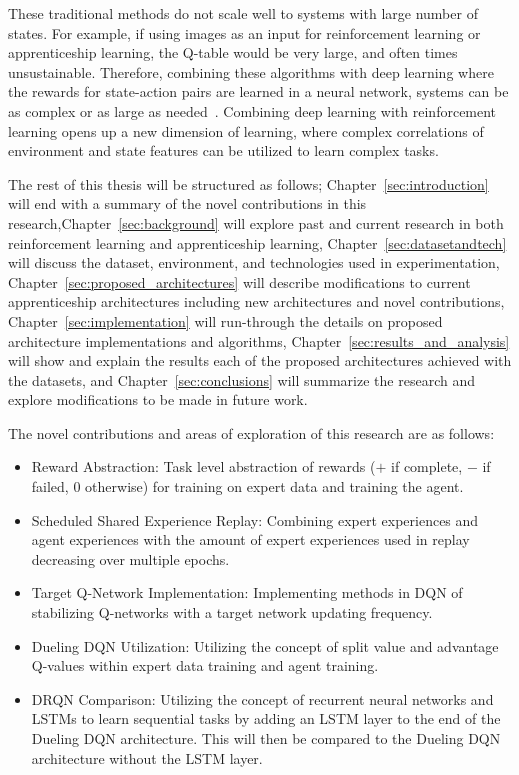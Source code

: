 \documentclass[12pt,american]{report}
\begin{document}
These traditional methods do not scale well to systems with large number of states.  For example, if using images as an input for reinforcement learning or apprenticeship learning, the Q-table would be very large, and often times unsustainable.  Therefore, combining these algorithms with deep learning where the rewards for state-action pairs are learned in a neural network, systems can be as complex or as large as needed~\cite{matiisen_2015}. Combining deep learning with reinforcement learning opens up a new dimension of learning, where complex correlations of environment and state features can be utilized to learn complex tasks.

The rest of this thesis will be structured as follows; Chapter~\ref{sec:introduction} will end with a summary of the novel contributions in this research,Chapter~\ref{sec:background} will explore past and current research in both reinforcement learning and apprenticeship learning, Chapter~\ref{sec:datasetandtech} will discuss the dataset, environment, and technologies used in experimentation, Chapter~\ref{sec:proposed_architectures} will describe modifications to current apprenticeship architectures including new architectures and novel contributions, Chapter~\ref{sec:implementation} will run-through the details on proposed architecture implementations and algorithms, Chapter~\ref{sec:results_and_analysis} will show and explain the results each of the proposed architectures achieved with the datasets, and Chapter~\ref{sec:conclusions} will summarize the research and explore modifications to be made in future work.

The novel contributions and areas of exploration of this research are as follows:
\begin{itemize}
  \item Reward Abstraction: Task level abstraction of rewards ($+$ if complete, $-$ if failed, $0$ otherwise) for training on expert data and training the agent.
  \item Scheduled Shared Experience Replay: Combining expert experiences and agent experiences with the amount of expert experiences used in replay decreasing over multiple epochs.
  \item Target Q-Network Implementation: Implementing methods in DQN of stabilizing Q-networks with a target network updating frequency.
  \item Dueling DQN Utilization: Utilizing the concept of split value and advantage Q-values within expert data training and agent training.
  \item DRQN Comparison: Utilizing the concept of recurrent neural networks and LSTMs to learn sequential tasks by adding an LSTM layer to the end of the Dueling DQN architecture. This will then be compared to the Dueling DQN architecture without the LSTM layer.
\end{itemize}
\end{document}
